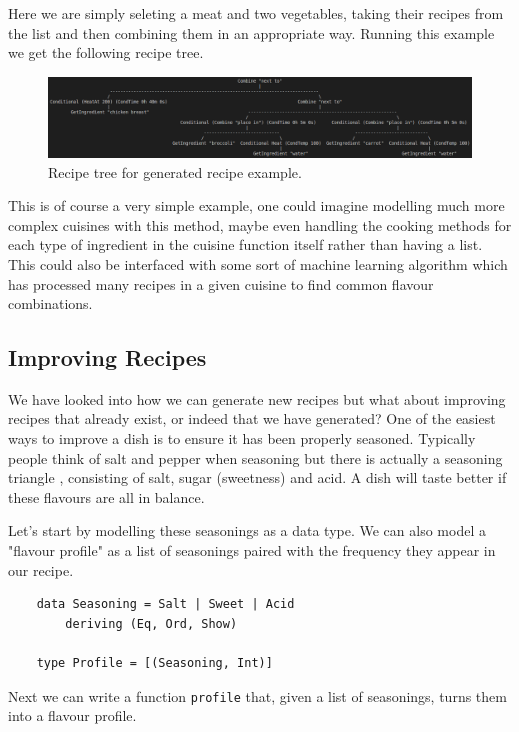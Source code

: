\documentclass[11pt]{article}
\begin{document}
Here we are simply seleting a meat and two vegetables, taking their
recipes from the list and then combining them in an appropriate way.
Running this example we get the following recipe tree.

\begin{figure}[h]
\includegraphics[width=\textwidth, keepaspectratio]{meatTwoVeg.png}
\centering
\caption{Recipe tree for generated recipe example.}
\end{figure}

This is of course a very simple example, one could imagine modelling much more complex
cuisines with this method, maybe even handling the cooking methods for each type of
ingredient in the cuisine function itself rather than having a list. This could also
be interfaced with some sort of machine learning algorithm which has processed
many recipes in a given cuisine to find common flavour combinations.

\subsection{Improving Recipes}

We have looked into how we can generate new recipes but what about improving recipes
that already exist, or indeed that we have generated? One of the easiest ways to
improve a dish is to ensure it has been properly seasoned. Typically people think
of salt and pepper when seasoning but there is actually a seasoning triangle \cite{seasoning},
consisting of salt, sugar (sweetness) and acid. A dish will taste better if these
flavours are all in balance.

\medbreak

Let's start by modelling these seasonings as a data type. We can also model a
"flavour profile" as a list of seasonings paired with the frequency they appear
in our recipe.

\begin{lstlisting}
    data Seasoning = Salt | Sweet | Acid
        deriving (Eq, Ord, Show)

    type Profile = [(Seasoning, Int)]
\end{lstlisting}

Next we can write a function \texttt{profile} that, given a list of seasonings,
turns them into a flavour profile.
\end{document}
